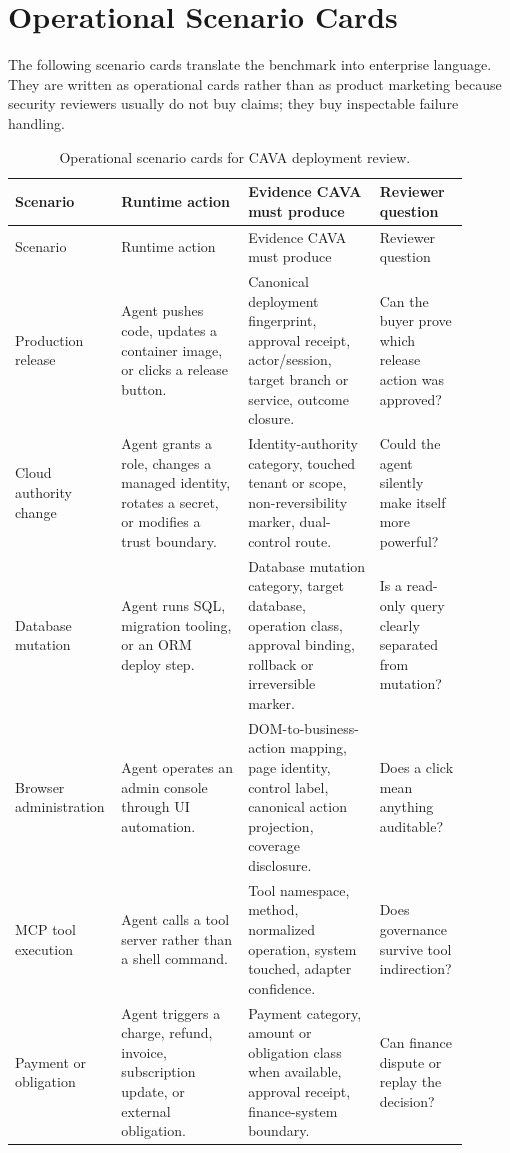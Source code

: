 \documentclass[11pt]{article}
\begin{document}
\section{Operational Scenario Cards}

The following scenario cards translate the benchmark into enterprise language. They are written as operational cards rather than as product marketing because security reviewers usually do not buy claims; they buy inspectable failure handling.

\begin{longtable}{@{}L{0.17\linewidth}L{0.27\linewidth}L{0.28\linewidth}L{0.18\linewidth}@{}}
\caption{Operational scenario cards for CAVA deployment review.}
\label{tab:scenario-cards}\\
\toprule
Scenario & Runtime action & Evidence CAVA must produce & Reviewer question \\
\midrule
\endfirsthead
\toprule
Scenario & Runtime action & Evidence CAVA must produce & Reviewer question \\
\midrule
\endhead
Production release & Agent pushes code, updates a container image, or clicks a release button. & Canonical deployment fingerprint, approval receipt, actor/session, target branch or service, outcome closure. & Can the buyer prove which release action was approved? \\
Cloud authority change & Agent grants a role, changes a managed identity, rotates a secret, or modifies a trust boundary. & Identity-authority category, touched tenant or scope, non-reversibility marker, dual-control route. & Could the agent silently make itself more powerful? \\
Database mutation & Agent runs SQL, migration tooling, or an ORM deploy step. & Database mutation category, target database, operation class, approval binding, rollback or irreversible marker. & Is a read-only query clearly separated from mutation? \\
Browser administration & Agent operates an admin console through UI automation. & DOM-to-business-action mapping, page identity, control label, canonical action projection, coverage disclosure. & Does a click mean anything auditable? \\
MCP tool execution & Agent calls a tool server rather than a shell command. & Tool namespace, method, normalized operation, system touched, adapter confidence. & Does governance survive tool indirection? \\
Payment or obligation & Agent triggers a charge, refund, invoice, subscription update, or external obligation. & Payment category, amount or obligation class when available, approval receipt, finance-system boundary. & Can finance dispute or replay the decision? \\

\end{longtable}
\end{document}
